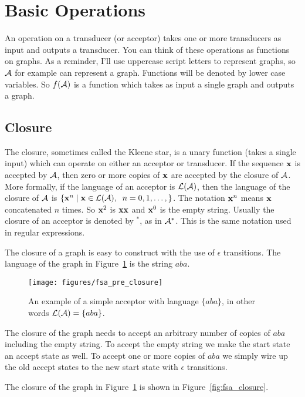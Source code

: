 \section{Basic Operations}
\label{sec:basic_operations}

An operation on a transducer (or acceptor) takes one or more transducers as
input and outputs a transducer. You can think of these operations as functions
on graphs. As a reminder, I'll use uppercase script letters to represent
graphs, so $\mathcal{A}$ for example can represent a graph. Functions will be denoted
by lower case variables. So $f(\mathcal{A})$ is a function which takes as input a
single graph and outputs a graph.

\subsection{Closure}

The closure, sometimes called the Kleene star, is a unary function (takes a
single input) which can operate on either an acceptor or transducer. If the
sequence ${\bf x}$ is accepted by $\mathcal{A}$, then zero or more copies of ${\bf x}$ are
accepted by the closure of $\mathcal{A}$. More formally, if the language of an acceptor
is $\mathcal{L}(\mathcal{A})$, then the language of the closure of $\mathcal{A}$ is $\{{\bf x}^n
\mid {\bf x} \in \mathcal{L}(\mathcal{A}),\;\; n = 0, 1, \ldots, \}$. The notation ${\bf x}^n$
means ${\bf x}$ concatenated $n$ times. So ${\bf x}^2$ is ${\bf x} {\bf x}$ and ${\bf x}^0$ is the
empty string. Usually the closure of an acceptor is denoted by $^*$, as in
$\mathcal{A}^*$. This is the same notation used in regular expressions.

The closure of a graph is easy to construct with the use of $\epsilon$
transitions. The language of the graph in Figure~\ref{fig:fsa_pre_closure} is
the string $aba$.

\begin{figure}
    \centering
    \texttt{[image: figures/fsa\_pre\_closure]}
    \caption{An example of a simple acceptor with language $\{aba\}$, in other
    words $\mathcal{L}(\mathcal{A}) = \{aba\}$.}
    \label{fig:fsa_pre_closure}
\end{figure}

The closure of the graph needs to accept an arbitrary number of copies of $aba$
including the empty string. To accept the empty string we make the start state
an accept state as well. To accept one or more copies of $aba$ we simply wire
up the old accept states to the new start state with $\epsilon$ transitions.

The closure of the graph in Figure~\ref{fig:fsa_pre_closure} is shown in
Figure~\ref{fig:fsa_closure}.

